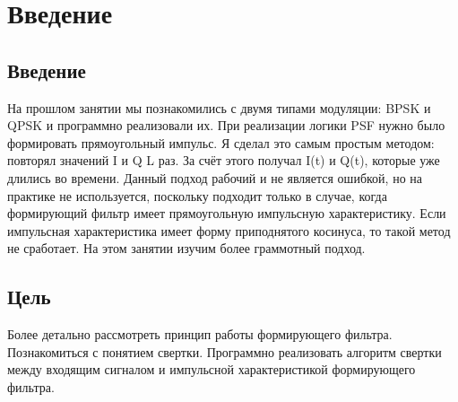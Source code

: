 \chapter{Введение}
\label{ch:intro}

\section{Введение}

На прошлом занятии мы познакомились с двумя типами модуляции: BPSK и QPSK и программно реализовали их. При реализации логики
PSF нужно было формировать прямоугольный импульс. Я сделал это самым простым методом: повторял значений I и Q L раз. За счёт этого
получал I(t) и Q(t), которые уже длились во времени. Данный подход рабочий и не является ошибкой, но на практике не используется,
поскольку подходит только в случае, когда формирующий фильтр имеет прямоугольную импульсную характеристику. Если импульсная характеристика
имеет форму приподнятого косинуса, то такой метод не сработает. На этом занятии изучим более граммотный подход.

\section{Цель}

Более детально рассмотреть принцип работы формирующего фильтра. Познакомиться с понятием свертки. 
Программно реализовать алгоритм свертки между входящим сигналом и импульсной характеристикой формирующего фильтра. 


\endinput